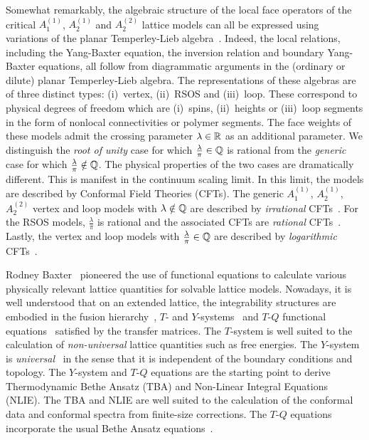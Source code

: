 \documentclass[11pt]{article}
\numberwithin{equation}{section}
\theoremstyle{plain}
\numberwithin{equation}{section}
\begin{document}
Somewhat remarkably, the algebraic structure of the local face operators of the critical $A_1^{(1)}$, $A_2^{(1)}$ and $A_2^{(2)}$ lattice models can all be expressed using variations of the planar Temperley-Lieb algebra~\cite{TempLieb1971,planarJones1999}. Indeed, the local relations, including the Yang-Baxter equation, the inversion relation and boundary Yang-Baxter equations, all follow from diagrammatic arguments in the (ordinary or dilute) planar Temperley-Lieb algebra. 
The representations of these algebras are of three distinct types: (i)~vertex, (ii)~RSOS and (iii)~loop. These correspond to physical degrees of freedom which are (i)~spins, (ii)~heights or (iii)~loop segments in the form of nonlocal connectivities or polymer segments. The face weights of these models admit the crossing parameter $\lambda\in{\Bbb R}$ as an additional parameter. 
We distinguish the {\em root of unity} case for which $\frac{\lambda}{\pi}\in {\Bbb Q}$ is rational from the {\em generic} case for which $\frac{\lambda}{\pi}\notin {\Bbb Q}$. The physical properties of the two cases are dramatically different. This is manifest in the continuum scaling limit. In this limit, the models are described by Conformal Field Theories (CFTs). The generic $A_1^{(1)}$, $A_2^{(1)}$, $A_2^{(2)}$ vertex and loop models with $\lambda\notin {\Bbb Q}$ are described by {\em irrational} CFTs~\cite{HKOC96}. For the RSOS models, $\frac{\lambda}{\pi}$ is rational and the associated CFTs are {\em rational} CFTs~\cite{MooreSeiberg}. Lastly, the vertex and loop models with $\frac{\lambda}{\pi}\in {\Bbb Q}$ are described by {\em logarithmic} CFTs~\cite{LCFT}.

\goodbreak
Rodney Baxter~\cite{BaxterBook1982} pioneered the use of functional equations to calculate various physically relevant lattice quantities for solvable lattice models. Nowadays, it is well understood that on an extended lattice, the integrability structures are embodied in the fusion hierarchy~\cite{BazhResh1989}, $T$- and $Y$-systems~\cite{Zam1991a,Zam1991b,KunibaNS9310,KNS2011,KP92,KNS94} and $T$-$Q$ functional equations~\cite{Baxter1972,Baxter1973,ZP95,BazhMang2007,FrahmMDP2019} satisfied by the transfer matrices. 
The $T$-system is well suited to the calculation of {\em non-universal\/} lattice quantities such as free energies. The $Y$-system is {\em universal\/}~\cite{CMP2001} in the sense that it is independent of the boundary conditions and topology. The $Y$-system and \mbox{$T$-$Q$} equations are the starting point to derive Thermodynamic Bethe Ansatz (TBA) and Non-Linear Integral Equations (NLIE). The TBA and NLIE are well suited to the calculation of the conformal data and conformal spectra from finite-size corrections. 
The $T$-$Q$ equations incorporate the usual Bethe Ansatz equations~\cite{Bethe1931}. 
\end{document}
